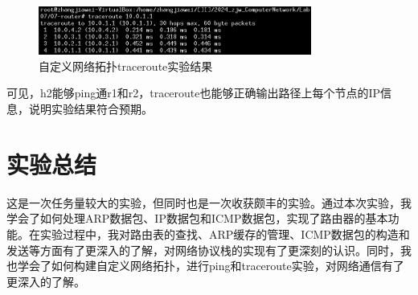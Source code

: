 \documentclass[UTF8]{report}
\begin{document}
\begin{figure}[H]
    \centering
    \includegraphics[width=0.8\textwidth]{h2routeh1.png}
    \caption{自定义网络拓扑traceroute实验结果}
\end{figure}

可见，h2能够ping通r1和r2，traceroute也能够正确输出路径上每个节点的IP信息，说明实验结果符合预期。

\section{实验总结}

这是一次任务量较大的实验，但同时也是一次收获颇丰的实验。通过本次实验，我学会了如何处理ARP数据包、IP数据包和ICMP数据包，实现了路由器的基本功能。在实验过程中，我对路由表的查找、ARP缓存的管理、ICMP数据包的构造和发送等方面有了更深入的了解，对网络协议栈的实现有了更深刻的认识。同时，我也学会了如何构建自定义网络拓扑，进行ping和traceroute实验，对网络通信有了更深入的了解。
\end{document}
